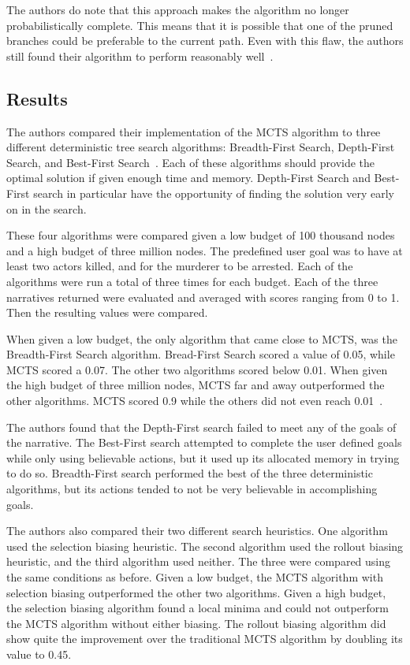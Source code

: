 \documentclass{sig-alternate}
\begin{document}
The authors do note that this approach makes the algorithm no longer probabilistically complete. This means that it is possible that one of the pruned branches could be preferable to the current path. Even with this flaw, the authors still found their algorithm to perform reasonably well~\cite{Narrative}.

\subsection{Results}
The authors compared their implementation of the MCTS algorithm to three different deterministic tree search algorithms: Breadth-First Search, Depth-First Search, and Best-First Search~\cite{Narrative}. Each of these algorithms should provide the optimal solution if given enough time and memory. Depth-First Search and Best-First search in particular have the opportunity of finding the solution very early on in the search.

These four algorithms were compared given a low budget of 100 thousand nodes and a high budget of three million nodes. The predefined user goal was to have at least two actors killed, and for the murderer to be arrested. Each of the algorithms were run a total of three times for each budget. Each of the three narratives returned were evaluated and averaged with scores ranging from 0 to 1. Then the resulting values were compared. 

When given a low budget, the only algorithm that came close to MCTS, was the Breadth-First Search algorithm. Bread-First Search scored a value of 0.05, while MCTS scored a 0.07. The other two algorithms scored below 0.01. When given the high budget of three million nodes, MCTS far and away outperformed the other algorithms. MCTS scored 0.9 while the others did not even reach 0.01~\cite{Narrative}.

The authors found that the Depth-First search failed to meet any of the goals of the narrative. The Best-First search attempted to complete the user defined goals while only using believable actions, but it used up its allocated memory in trying to do so. Breadth-First search performed the best of the three deterministic algorithms, but its actions tended to not be very believable in accomplishing goals.

The authors also compared their two different search heuristics. One algorithm used the selection biasing heuristic. The second algorithm used the rollout biasing heuristic, and the third algorithm used neither. The three were compared using the same conditions as before. Given a low budget, the MCTS algorithm with selection biasing outperformed the other two algorithms. Given a high budget, the selection biasing algorithm found a local minima and could not outperform the MCTS algorithm without either biasing. The rollout biasing algorithm did show quite the improvement over the traditional MCTS algorithm by doubling its value to 0.45.
\end{document}
